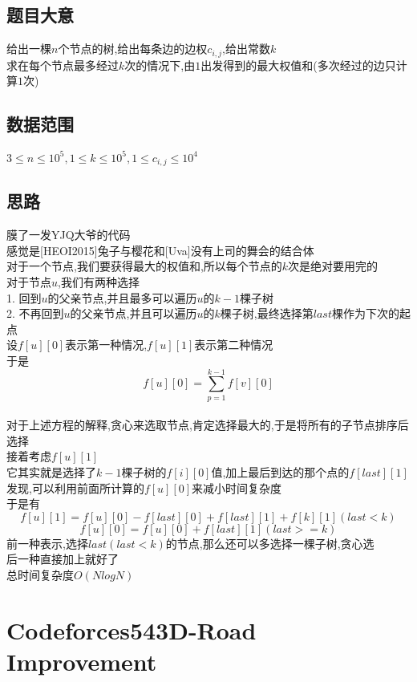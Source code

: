 \documentclass{ctexart}
\numberwithin{equation}{section}
\begin{document}
\begin{flushleft}
  \subsection{题目大意}
  给出一棵$n$个节点的树,给出每条边的边权$c_{i,j}$,给出常数$k$ \\
  求在每个节点最多经过$k$次的情况下,由$1$出发得到的最大权值和(多次经过的边只计算$1$次)\\
  \subsection{数据范围}
  $3\le n \le 10^5,1\le k \le 10^5,1\le c_{i,j} \le 10^4$ \\
  \subsection{思路}
  膜了一发YJQ大爷的代码\\
  感觉是[HEOI2015]兔子与樱花和[Uva]没有上司的舞会的结合体 \\
  对于一个节点,我们要获得最大的权值和,所以每个节点的$k$次是绝对要用完的 \\
  对于节点$u$,我们有两种选择 \\
  1. 回到$u$的父亲节点,并且最多可以遍历$u$的$k-1$棵子树 \\
  2. 不再回到$u$的父亲节点,并且可以遍历$u$的$k$棵子树,最终选择第$last$棵作为下次的起点 \\
  设$f[u][0]$表示第一种情况,$f[u][1]$表示第二种情况 \\
  于是$$f[u][0] = \sum_{p=1}^{k-1}f[v][0]$$\\
  对于上述方程的解释,贪心来选取节点,肯定选择最大的,于是将所有的子节点排序后选择 \\
  接着考虑$f[u][1]$\\
  它其实就是选择了$k-1$棵子树的$f[i][0]$值,加上最后到达的那个点的$f[last][1]$ \\
  发现,可以利用前面所计算的$f[u][0]$来减小时间复杂度 \\
  于是有$$f[u][1]=f[u][0]-f[last][0]+f[last][1]+f[k][1] (last<k) $$
  $$f[u][0]=f[u][0]+f[last][1] (last>=k) $$
  前一种表示,选择$last(last<k)$的节点,那么还可以多选择一棵子树,贪心选\\
  后一种直接加上就好了 \\
  总时间复杂度$O(NlogN)$ \\
  \newpage

  \section{Codeforces543D-Road Improvement}

\end{flushleft}
\end{document}
